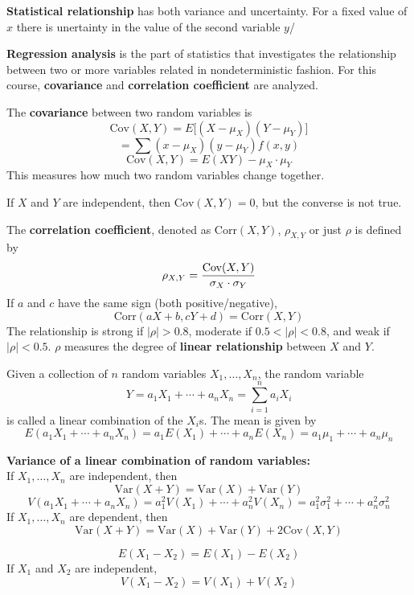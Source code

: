 \documentclass[english, 12pt]{article}
\begin{document}
\begin{defn}
\textbf{Statistical relationship} has both variance and uncertainty. For a fixed value of $x$ there is unertainty in the value of the second variable $y$/
\end{defn}

\begin{defn}
\textbf{Regression analysis} is the part of statistics that investigates the relationship between two or more variables related in nondeterministic fashion. For this course, \textbf{covariance} and \textbf{correlation coefficient} are analyzed.
\end{defn}

\begin{defn}
The \textbf{covariance} between two random variables is
\[\text{Cov}(X,Y) = E \lbrack (X - \mu_X)(Y - \mu_Y) \rbrack\]
\[= \sum (x - \mu_X)(y-\mu_Y) f(x,y)\]
\[\text{Cov}(X,Y) = E(XY) - \mu_X \cdot \mu_Y\]
This measures how much two random variables change together.
\end{defn}

\begin{note}
If $X$ and $Y$ are independent, then $\text{Cov}(X,Y) = 0$, but the converse is not true.
\end{note}

\begin{defn}
The \textbf{correlation coefficient}, denoted as $\text{Corr}(X,Y)$, $\rho_{X,Y}$ or just $\rho$ is defined by
\[\rho_{X,Y} = \frac{\text{Cov}(X,Y)}{\sigma_X \cdot \sigma_Y}\]
If $a$ and $c$ have the same sign (both positive/negative),
\[\text{Corr}(aX+b,cY+d) = \text{Corr}(X,Y)\]
The relationship is strong if $|\rho| > 0.8$, moderate if $0.5 < |\rho| < 0.8$, and weak if $|\rho| < 0.5$.
$\rho$ measures the degree of \textbf{linear relationship} between $X$ and $Y$.
\end{defn}


\begin{defn}
Given a collection of $n$ random variables $X_1,\dots,X_n$, the random variable
\[Y = a_1 X_1 + \cdots + a_n X_n = \sum_{i=1}^n a_{i} X_i\]
is called a linear combination of the $X_{i}$s. The mean is given by
\[E(a_1 X_1 + \cdots + a_n X_n) = a_1 E(X_1) + \cdots + a_n E(X_n) = a_1 \mu_1 + \cdots + a_n \mu_n\]
\end{defn}

\begin{thrm}
\textbf{Variance of a linear combination of random variables:} \\
If $X_1,\dots,X_n$ are independent, then
\[\text{Var}(X+Y) = \text{Var}(X) + \text{Var}(Y)\]
\[V(a_1 X_1 + \cdots + a_n X_n) = a_{1}^2 V(X_1) + \cdots + a_{n}^2 V(X_n) = a_{1}^2 \sigma_{1}^2 + \cdots + a_{n}^2 \sigma_{n}^2\]
If $X_1,\dots,X_n$ are dependent, then
\[\text{Var}(X+Y) = \text{Var}(X) + \text{Var}(Y) + 2 \text{Cov}(X,Y)\]
\end{thrm}

\[E(X_{1} - X_{2}) = E(X_{1}) - E(X_{2})\]
If $X_{1}$ and $X_{2}$ are independent,
\[V(X_{1} - X_{2}) = V(X_{1}) + V(X_{2})\]

\end{document}
